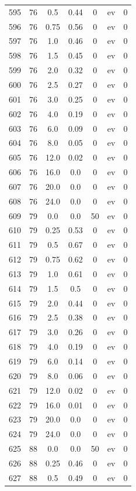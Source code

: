 \documentclass[12pt,a4paper]{article}
\begin{document}
\begin{tabular}{r|cccccc}
	595 & 76 & 0.5 & 0.44 & 0 & ev & 0 \\
	596 & 76 & 0.75 & 0.56 & 0 & ev & 0 \\
	597 & 76 & 1.0 & 0.46 & 0 & ev & 0 \\
	598 & 76 & 1.5 & 0.45 & 0 & ev & 0 \\
	599 & 76 & 2.0 & 0.32 & 0 & ev & 0 \\
	600 & 76 & 2.5 & 0.27 & 0 & ev & 0 \\
	601 & 76 & 3.0 & 0.25 & 0 & ev & 0 \\
	602 & 76 & 4.0 & 0.19 & 0 & ev & 0 \\
	603 & 76 & 6.0 & 0.09 & 0 & ev & 0 \\
	604 & 76 & 8.0 & 0.05 & 0 & ev & 0 \\
	605 & 76 & 12.0 & 0.02 & 0 & ev & 0 \\
	606 & 76 & 16.0 & 0.0 & 0 & ev & 0 \\
	607 & 76 & 20.0 & 0.0 & 0 & ev & 0 \\
	608 & 76 & 24.0 & 0.0 & 0 & ev & 0 \\
	609 & 79 & 0.0 & 0.0 & 50 & ev & 0 \\
	610 & 79 & 0.25 & 0.53 & 0 & ev & 0 \\
	611 & 79 & 0.5 & 0.67 & 0 & ev & 0 \\
	612 & 79 & 0.75 & 0.62 & 0 & ev & 0 \\
	613 & 79 & 1.0 & 0.61 & 0 & ev & 0 \\
	614 & 79 & 1.5 & 0.5 & 0 & ev & 0 \\
	615 & 79 & 2.0 & 0.44 & 0 & ev & 0 \\
	616 & 79 & 2.5 & 0.38 & 0 & ev & 0 \\
	617 & 79 & 3.0 & 0.26 & 0 & ev & 0 \\
	618 & 79 & 4.0 & 0.19 & 0 & ev & 0 \\
	619 & 79 & 6.0 & 0.14 & 0 & ev & 0 \\
	620 & 79 & 8.0 & 0.06 & 0 & ev & 0 \\
	621 & 79 & 12.0 & 0.02 & 0 & ev & 0 \\
	622 & 79 & 16.0 & 0.01 & 0 & ev & 0 \\
	623 & 79 & 20.0 & 0.0 & 0 & ev & 0 \\
	624 & 79 & 24.0 & 0.0 & 0 & ev & 0 \\
	625 & 88 & 0.0 & 0.0 & 50 & ev & 0 \\
	626 & 88 & 0.25 & 0.46 & 0 & ev & 0 \\
	627 & 88 & 0.5 & 0.49 & 0 & ev & 0 \\

\end{tabular}
\end{document}
